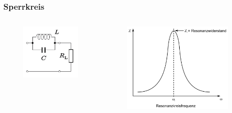 \begin{frame}
  \frametitle{Sperrkreis}
  \begin{center}
    \begin{columns}
      \begin{figure}
        \includegraphics[width=\textwidth,height=.45\textheight,keepaspectratio]{e07/Sperrkreis.png}
      \end{figure}
      \begin{figure}
        \includegraphics[width=\textwidth,height=.45\textheight,keepaspectratio]{e07/ParallelschwSig.png}

\end{figure}
\end{columns}
\end{center}
\end{frame}
